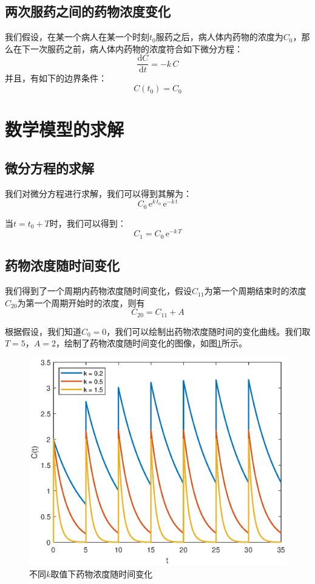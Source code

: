 \documentclass[12pt,AutoFakeSlant,AutoFakeBold]{article}
\begin{document}
\subsection{两次服药之间的药物浓度变化}

我们假设，在某一个病人在某一个时刻$t_0$服药之后，病人体内药物的浓度为$C_0$，那么在下一次服药之前，病人体内药物的浓度符合如下微分方程：
\begin{equation}
    \frac{\mathrm{d}C}{\mathrm{d}t} = -k\,C
\end{equation}
并且，有如下的边界条件：
\begin{equation}
    C(t_0) = C_0
\end{equation}

\section{数学模型的求解}

\subsection{微分方程的求解}

我们对微分方程进行求解，我们可以得到其解为：
\begin{equation}
    C_{0}\,{\mathrm{e}}^{k\,t_{0}}\,{\mathrm{e}}^{-k\,t}
\end{equation}

当$t = t_0 + T$时，我们可以得到：
\begin{equation}
    C_{1} = C_{0}\,{\mathrm{e}}^{-k\,T}
\end{equation}

\subsection{药物浓度随时间变化}

我们得到了一个周期内药物浓度随时间变化，假设$C_{11}$为第一个周期结束时的浓度$C_{20}$为第一个周期开始时的浓度，则有
\begin{equation}
    C_{20} = C_{11} + A
\end{equation}

根据假设，我们知道$C_{0} = 0$，我们可以绘制出药物浓度随时间的变化曲线。我们取$T=5$，$A=2$，绘制了药物浓度随时间变化的图像，如图\ref{fig:药物浓度随时间变化}所示。

\begin{figure}[!ht]
    \centering
    \includegraphics[width=0.5\linewidth]{浓度随时间变化.eps}
    \caption{不同$k$取值下药物浓度随时间变化}
    \label{fig:药物浓度随时间变化}
\end{figure}
\end{document}
